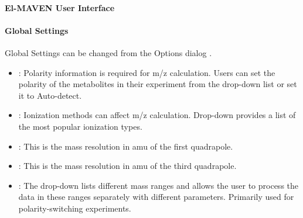 \documentclass[letterpaper,10pt,english,openany,oneside]{sphinxmanual}
\begin{document}
\paragraph{El-MAVEN User Interface}
\label{\detokenize{IntroductiontoElMAVENUI:id1}}


\paragraph{Global Settings}
\label{\detokenize{IntroductiontoElMAVENUI:global-settings}}
Global Settings can be changed from the Options dialog .


\begin{itemize}
\item {} 
: Polarity information is required for m/z calculation. Users can set the polarity of the metabolites in their experiment from the drop-down list or set it to Auto-detect.

\item {} 
: Ionization methods can affect m/z calculation. Drop-down provides a list of the most popular ionization types.

\item {} 
: This is the mass resolution in amu of the first quadrapole.

\item {} 
: This is the mass resolution in amu of the third quadrapole.

\item {} 
: The drop-down lists different mass ranges and allows the user to process the data in these ranges separately with different parameters. Primarily used for polarity-switching experiments.

\end{itemize}

\end{document}

